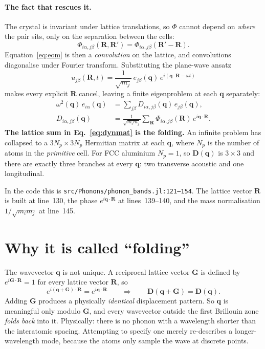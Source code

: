 \documentclass[11pt]{article}
\newcommand{\file}[1]{\texttt{\footnotesize #1}}
\begin{document}
\paragraph{The fact that rescues it.} The crystal is invariant under lattice
translations, so $\Phi$ cannot depend on \emph{where} the pair sits, only on the
separation between the cells:
%
\begin{equation}
\Phi_{i\alpha,j\beta}(\bm R,\bm R') = \Phi_{i\alpha,j\beta}(\bm R' - \bm R).
\label{eq:translation}
\end{equation}
%
Equation~\eqref{eq:eom} is then a \emph{convolution} on the lattice, and
convolutions diagonalise under Fourier transform. Substituting the plane-wave
ansatz
%
\begin{equation}
u_{j\beta}(\bm R,t)
  = \frac{1}{\sqrt{m_j}}\, e_{j\beta}(\bm q)\, e^{i(\bm q\cdot\bm R - \omega t)}
\label{eq:ansatz}
\end{equation}
%
makes every explicit $\bm R$ cancel, leaving a finite eigenproblem at each
$\bm q$ separately:
%
\begin{align}
\omega^2(\bm q)\, e_{i\alpha}(\bm q)
  &= \sum_{j\beta} D_{i\alpha,j\beta}(\bm q)\, e_{j\beta}(\bm q),
\label{eq:eigen}\\[2pt]
D_{i\alpha,j\beta}(\bm q)
  &= \frac{1}{\sqrt{m_i m_j}}\sum_{\bm R}
     \Phi_{i\alpha,j\beta}(\bm R)\, e^{i\bm q\cdot\bm R}.
\label{eq:dynmat}
\end{align}
%
\textbf{The lattice sum in Eq.~\eqref{eq:dynmat} is the folding.} An infinite
problem has collapsed to a $3N_p \times 3N_p$ Hermitian matrix at each $\bm q$,
where $N_p$ is the number of atoms in the \emph{primitive} cell. For FCC
aluminium $N_p = 1$, so $\bm D(\bm q)$ is $3\times3$ and there are exactly three
branches at every $\bm q$: two transverse acoustic and one longitudinal.

In the code this is \file{src/Phonons/phonon\_bands.jl:121--154}. The lattice
vector $\bm R$ is built at line~130, the phase $e^{i\bm q\cdot\bm R}$ at
lines~139--140, and the mass normalisation $1/\sqrt{m_im_j}$ at line~145.

\section{Why it is called ``folding''}

The wavevector $\bm q$ is not unique. A reciprocal lattice vector $\bm G$ is
defined by $e^{i\bm G\cdot\bm R} = 1$ for every lattice vector $\bm R$, so
%
\begin{equation}
e^{i(\bm q + \bm G)\cdot\bm R} = e^{i\bm q\cdot\bm R}
\qquad\Longrightarrow\qquad
\bm D(\bm q + \bm G) = \bm D(\bm q).
\label{eq:periodicity}
\end{equation}
%
Adding $\bm G$ produces a physically \emph{identical} displacement pattern. So
$\bm q$ is meaningful only modulo $\bm G$, and every wavevector outside the first
Brillouin zone \emph{folds back} into it. Physically: there is no phonon with a
wavelength shorter than the interatomic spacing. Attempting to specify one merely
re-describes a longer-wavelength mode, because the atoms only sample the wave at
discrete points.
\end{document}
